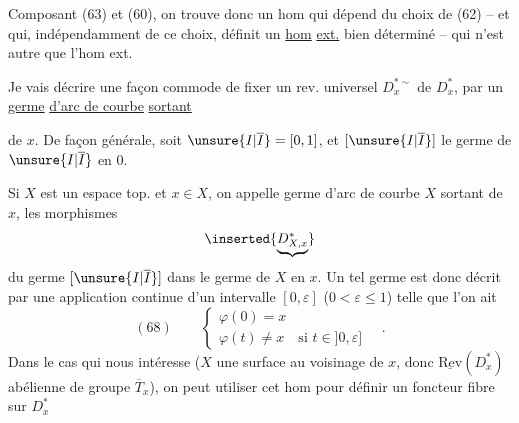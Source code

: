 Composant (63) et (60), on trouve donc un hom
qui dépend du choix de (62) -- et qui, indépendamment de ce choix, définit un \uline{hom} \uline{ext.} bien déterminé -- qui n'est autre que l'hom ext.

Je vais décrire une façon commode de fixer un rev. universel $D_x^{*\sim}$ de $D_x^*$, par un \uline{germe} \uline{d'arc de courbe}  \uline{sortant}

de $x$. De façon générale, soit $\unsure{I|\overline I}=[0,1]$, et $[\unsure{I|\overline I}]$ le germe  de $\unsure{I|\overline I}$ en $0$.  


Si $X$ est un espace top. et $x\in X$, on appelle germe d'arc de courbe  $X$ sortant de $x$, les morphismes
\[
\inserted{\underbrace{D_{X,x}^*}}
\]
du germe $[\unsure{I|\overline I}]$ dans le germe  de $X$ en $x$. Un tel germe est donc décrit par une application continue d'un intervalle $[0,\varepsilon]$ ($0<\varepsilon\leq1$)
telle que l'on ait
\[
(68)\qquad\left\{\begin{array}{l}
\varphi(0)=x\\
\varphi(t)\neq x\quad\text{si }t\in]0,\varepsilon]
\end{array}\right.\quad.
\]
Dans le cas qui nous intéresse ($X$ une surface au voisinage de $x$, donc $\underline{\mathrm{Rev}}(D_x^*)$   abélienne de groupe $\overline T_x$), on peut utiliser cet hom pour définir un foncteur fibre sur $D_x^*$

